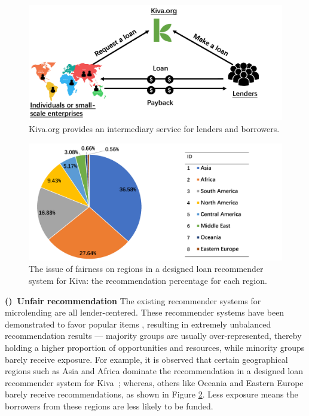\begin{figure}[htb]
\includegraphics[width=0.98\columnwidth]{imgs/far/microlending.png}
\caption{Kiva.org provides an intermediary service for lenders and borrowers.}
\label{fig:kiva_process}
\end{figure}

\begin{figure}[htb]
\includegraphics[width=0.98\columnwidth]{imgs/far/kiva.png}
\caption{The issue of fairness on regions in a designed loan recommender system \cite{choo2014gather} for Kiva: the recommendation percentage for each region.}
\label{fig:recom_result}
\end{figure}


\textbf{()~Unfair recommendation} The existing recommender systems for microlending are all lender-centered. These recommender systems have been demonstrated to favor popular items \cite{celma2008hits,lee2014fairness}, resulting in extremely unbalanced recommendation results --- majority groups are usually over-represented, thereby holding a higher proportion of opportunities and resources, while minority groups barely receive exposure. For example, it is observed that certain geographical regions such as Asia and Africa dominate the recommendation in a designed loan recommender system for Kiva~\cite{choo2014gather}; whereas, others like Oceania and Eastern Europe barely receive recommendations, as shown in Figure \ref{fig:recom_result}. Less exposure means the borrowers from these regions are less likely to be funded.

